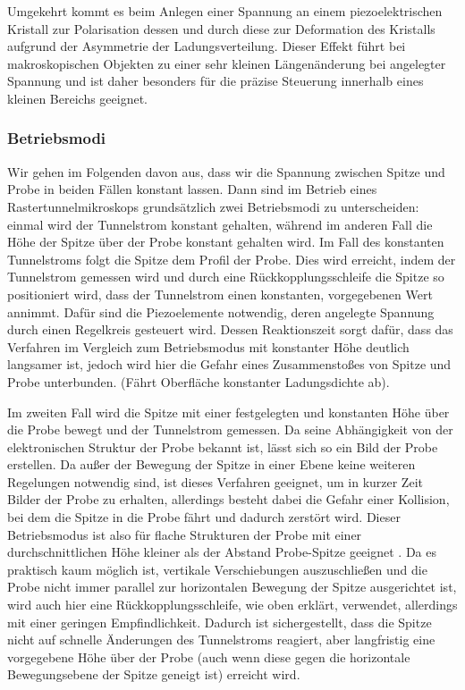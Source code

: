 \documentclass[10pt, a4paper]{article}
\begin{document}
Umgekehrt kommt es beim Anlegen einer Spannung an einem piezoelektrischen Kristall zur Polarisation dessen und durch diese zur Deformation des Kristalls aufgrund der Asymmetrie der Ladungsverteilung.
Dieser Effekt führt bei makroskopischen Objekten zu einer sehr kleinen Längenänderung bei angelegter Spannung und ist daher besonders für die präzise Steuerung innerhalb eines kleinen Bereichs geeignet.

\subsubsection{Betriebsmodi}
\label{sec:betriebsmodi}
Wir gehen im Folgenden davon aus, dass wir die Spannung zwischen Spitze und Probe in beiden Fällen konstant lassen.
Dann sind im Betrieb eines Rastertunnelmikroskops grundsätzlich zwei Betriebsmodi zu unterscheiden:
einmal wird der Tunnelstrom konstant gehalten, während im anderen Fall die Höhe der Spitze über der Probe konstant gehalten wird.
Im Fall des konstanten Tunnelstroms folgt die Spitze dem Profil der Probe.
Dies wird erreicht, indem der Tunnelstrom gemessen wird und durch eine Rückkopplungsschleife die Spitze so positioniert wird, dass der Tunnelstrom einen konstanten, vorgegebenen Wert annimmt.
Dafür sind die Piezoelemente notwendig, deren angelegte Spannung durch einen Regelkreis gesteuert wird.
Dessen Reaktionszeit sorgt dafür, dass das Verfahren im Vergleich zum Betriebsmodus mit konstanter Höhe deutlich langsamer ist, jedoch wird hier die Gefahr eines Zusammenstoßes von Spitze und Probe  unterbunden.
(Fährt Oberfläche konstanter Ladungsdichte ab).

Im zweiten Fall wird die Spitze mit einer festgelegten und konstanten Höhe über die Probe bewegt und der Tunnelstrom gemessen.
Da seine Abhängigkeit von der elektronischen Struktur der Probe bekannt ist, lässt sich so ein Bild der Probe erstellen.
Da außer der Bewegung der Spitze in einer Ebene keine weiteren Regelungen notwendig sind, ist dieses Verfahren geeignet, um in kurzer Zeit Bilder der Probe zu erhalten, allerdings besteht dabei die Gefahr einer Kollision, bei dem die Spitze in die Probe fährt und dadurch zerstört wird.
Dieser Betriebsmodus ist also für flache Strukturen der Probe mit einer durchschnittlichen Höhe kleiner als der Abstand Probe-Spitze geeignet \cite{colton}.
Da es praktisch kaum möglich ist, vertikale Verschiebungen auszuschließen und die Probe nicht immer parallel zur horizontalen Bewegung der Spitze ausgerichtet ist, wird auch hier eine Rückkopplungsschleife, wie oben erklärt, verwendet, allerdings mit einer geringen Empfindlichkeit. Dadurch ist sichergestellt, dass die Spitze nicht auf schnelle Änderungen des Tunnelstroms reagiert, aber langfristig eine vorgegebene Höhe über der Probe (auch wenn diese gegen die horizontale Bewegungsebene der Spitze geneigt ist) erreicht wird.
 
\end{document}
